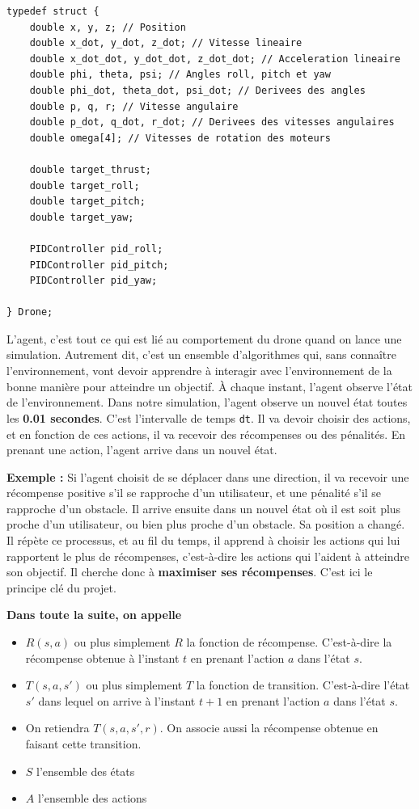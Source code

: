 \documentclass{article}
\begin{document}
\begin{lstlisting}[style=CStyle]
    typedef struct {
    double x, y, z; // Position
    double x_dot, y_dot, z_dot; // Vitesse lineaire
    double x_dot_dot, y_dot_dot, z_dot_dot; // Acceleration lineaire
    double phi, theta, psi; // Angles roll, pitch et yaw
    double phi_dot, theta_dot, psi_dot; // Derivees des angles
    double p, q, r; // Vitesse angulaire
    double p_dot, q_dot, r_dot; // Derivees des vitesses angulaires
    double omega[4]; // Vitesses de rotation des moteurs

    double target_thrust;
    double target_roll;
    double target_pitch;
    double target_yaw;

    PIDController pid_roll;
    PIDController pid_pitch;
    PIDController pid_yaw;

} Drone;
\end{lstlisting}

L'agent, c'est tout ce qui est lié au comportement du drone quand on lance une simulation.
Autrement dit, c'est un ensemble d'algorithmes qui, sans connaître l'environnement, 
vont devoir apprendre à interagir avec l'environnement de la bonne manière pour atteindre un objectif.
À chaque instant, l'agent observe l'état de l'environnement. Dans notre simulation, l'agent observe un nouvel état toutes 
les \textbf{0.01 secondes}. C'est l'intervalle de temps \texttt{dt}.
Il va devoir choisir des actions, et en fonction de ces actions, il va recevoir des récompenses ou des pénalités.
En prenant une action, l'agent arrive dans un nouvel état.

\vspace{0.5cm}

\textbf{Exemple : } Si l'agent choisit de se déplacer dans une direction, il va recevoir une récompense positive s'il se rapproche d'un utilisateur,
 et une pénalité s'il se rapproche d'un obstacle. Il arrive ensuite dans un nouvel état où il est soit plus proche d'un utilisateur, 
 ou bien plus proche d'un obstacle. Sa position a changé.
Il répète ce processus, et au fil du temps, il apprend à choisir les actions qui lui rapportent le plus de récompenses, c'est-à-dire les actions qui l'aident à atteindre son objectif.
Il cherche donc à \textbf{maximiser ses récompenses}. C'est ici le principe clé du projet.

\vspace{0.5cm}

\textbf{Dans toute la suite, on appelle}
\begin{itemize}
    \item $R(s, a)$ ou plus simplement $R$ la fonction de récompense. C'est-à-dire la récompense obtenue à l'instant $t$ en prenant l'action $a$ dans l'état $s$.
    \item $T(s, a, s')$ ou plus simplement $T$ la fonction de transition. C'est-à-dire l'état $s'$ dans lequel on arrive à l'instant $t+1$ en prenant l'action $a$ dans l'état $s$.
    \item On retiendra $T(s, a, s', r)$. On associe aussi la récompense obtenue en faisant cette transition.
    \item $S$ l'ensemble des états
    \item $A$ l'ensemble des actions
\end{itemize}
 
\end{document}
